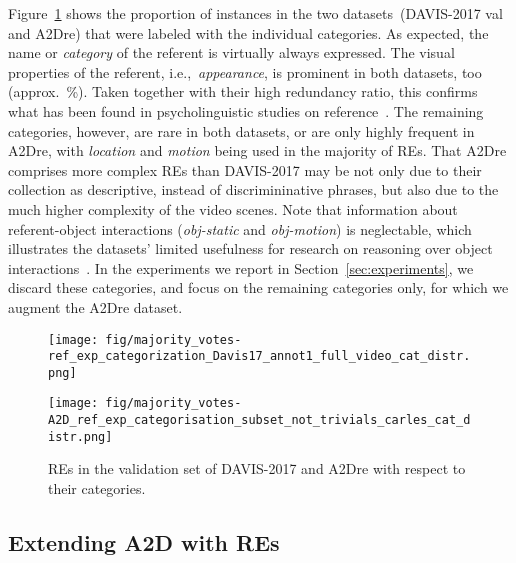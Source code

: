 \documentclass[10pt,twocolumn,letterpaper]{article}
\begin{document}
Figure~\ref{fig:analysis_datasets} shows the proportion of instances in the two datasets~(DAVIS-2017 val and A2Dre) that were labeled with the individual categories. 
As expected, the name or \textit{category} of the referent is virtually always expressed. 
The visual properties of the referent, i.e.,~\textit{appearance}, is prominent in both datasets, too (approx.~\%). 
Taken together with their high redundancy ratio, this confirms what has been found in psycholinguistic studies on reference~\cite{levelt89}. 
The remaining categories, however, are rare in both datasets, or are only highly frequent in A2Dre, with \textsl{location} and \textsl{motion} being used in the majority of REs. 
That A2Dre comprises more complex REs than DAVIS-2017 may be not only  due to their collection as descriptive, instead of discrimininative phrases, but also due to the much higher complexity of the video scenes. 
Note that information about referent-object interactions (\textit{obj-static} and \textit{obj-motion}) is neglectable, which illustrates the datasets' limited usefulness for research on reasoning over object interactions~\cite{wang2018NeighbourhoodWR,zhang2019referring,yang2019dynamic}. In the experiments we report in Section~\ref{sec:experiments}, we discard these categories, and focus on the remaining categories only, for which we augment the A2Dre dataset.




\begin{figure}[!tbp]
\centering
\begin{minipage}[t]{0.23\textwidth}

\texttt{[image: fig/majority\_votes-ref\_exp\_categorization\_Davis17\_annot1\_full\_video\_cat\_distr.png]}
  \end{minipage}
\begin{minipage}[t]{0.23\textwidth}

\texttt{[image: fig/majority\_votes-A2D\_ref\_exp\_categorisation\_subset\_not\_trivials\_carles\_cat\_distr.png]}
  \end{minipage}
\caption{REs in the validation set of DAVIS-2017 and  A2Dre with respect to their categories.}
\label{fig:analysis_datasets}
\end{figure}

\subsection{Extending A2D with REs}
\label{sec:data-collection}
\end{document}
